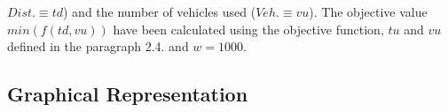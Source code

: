 \begin{itemize}
\begin{math}
Dist. \equiv td\end{math}) and the number of vehicles used (\begin{math}Veh. \equiv vu\end{math}). The objective value \begin{math} min(f(td,vu)) \end{math} have been calculated using the objective function, \begin{math} tu \end{math} and \begin{math} vu \end{math} defined in the paragraph 2.4. and \begin{math} w = 1000 \end{math}.
\end{itemize}
\newpage
\subsection{Graphical Representation}
